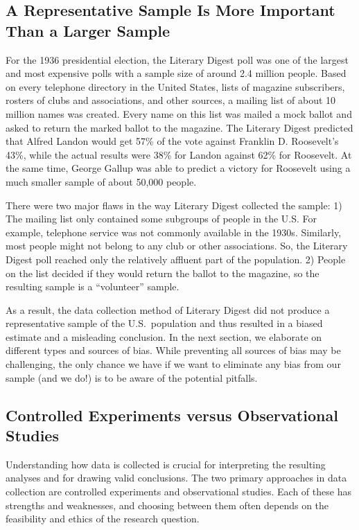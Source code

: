 \subsection{A Representative Sample Is More Important Than a Larger Sample}\label{representative-size}

\begin{example}
 For the 1936 presidential election, the Literary Digest poll was one of the
largest and most expensive polls with a sample size of around 2.4 million
people. Based on every telephone directory in the United States, lists of
magazine subscribers, rosters of clubs and associations, and other sources, a
mailing list of about 10 million names was created. Every name on this list was
mailed a mock ballot and asked to return the marked ballot to the magazine. The
Literary Digest predicted that Alfred Landon would get 57\% of the vote against
Franklin D. Roosevelt's 43\%, while the actual results were 38\% for Landon
against 62\% for Roosevelt. At the same time, George Gallup was able to predict
a victory for Roosevelt using a much smaller sample of about 50,000 people.

There were two major flaws in the way Literary Digest collected the sample: 1) The
mailing list only contained some subgroups of people in the U.S. For example,
telephone service was not commonly available in the 1930s. Similarly, most people might not
belong to any club or other associations. So, the Literary Digest poll
reached only the relatively affluent part of the population.
2) People on the list decided if they
would return the ballot to the magazine, so the resulting sample is a
``volunteer'' sample.

As a result, the data collection method of Literary Digest
did not produce a representative sample of the U.S.\ population and thus 
resulted in a biased estimate and a misleading conclusion.  In the next section,
we elaborate on different types and sources of bias. While preventing
all sources of bias may be challenging, the only chance we have if we want
to eliminate any bias from our sample (and we do!) is to be aware of the potential
pitfalls.
\end{example}

\subsection{Controlled Experiments versus Observational Studies}

Understanding how data is collected is crucial for interpreting the resulting
analyses and for drawing valid conclusions. The two primary approaches in data
collection are controlled experiments and observational studies. Each of these
has strengths and weaknesses, and choosing between them often depends on the
feasibility and ethics of the research question.

